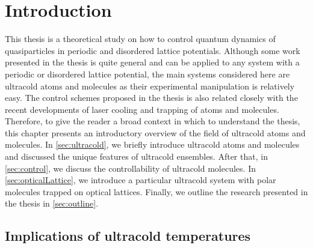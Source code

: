 
\chapter{Introduction}
\label{ch:Introduction}

This thesis is a theoretical study on how to control quantum dynamics of quasiparticles in periodic and disordered lattice potentials. 
Although some work presented in the thesis is quite general and can be applied to any system with a periodic or disordered lattice potential, 
the main systems considered here are ultracold atoms and molecules as their experimental manipulation is 
relatively easy. The control schemes proposed in the thesis is also related closely with the recent developments of laser 
cooling and trapping of atoms and molecules. Therefore, to give the reader a broad context in which to understand the 
thesis, this chapter presents an introductory overview of the field of ultracold atoms and molecules. In \autoref{sec:ultracold}, we briefly introduce ultracold  atoms and molecules and discussed the unique features of ultracold ensembles. After
that, in \autoref{sec:control}, we discuss the controllability of ultracold molecules. In
 \autoref{sec:opticalLattice}, we introduce a particular ultracold system with polar molecules trapped on optical lattices.  
Finally, we outline the research presented in the thesis in \autoref{sec:outline}. 

\section{Implications of ultracold temperatures}
\label{sec:ultracold}


